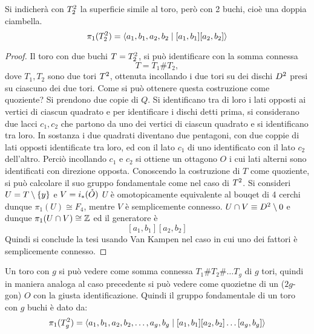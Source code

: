 \documentclass[]{article}
\begin{document}
\begin{proposition}  \nl
    Si indicher\`a con $T^{2}_{2}$ la superficie simile al toro, per\`o con 2 buchi, cio\`e una doppia ciambella.
    \[
        \pi_1(T^{2}_{2}) = \left< a_1, b_1, a_2, b_2 \mid [a_1, b_1][a_2, b_2]\right>
    \]
\end{proposition}

\begin{proof} \nl
    Il toro con due buchi $T = T^{2}_{2}$, si pu\`o identificare con la somma connessa
    \[
        T = T_1 \# T_2,
    \]
    dove $T_1, T_2$ sono due tori $T^{2}$, ottenuta incollando i due tori su dei dischi $D^{2}$ presi su ciascuno dei due tori. \nl
    Come si pu\`o ottenere questa costruzione come quoziente? \nl
    Si prendono due copie di $Q$. Si identificano tra di loro i lati opposti ai vertici di ciascun quadrato e
    per identificare i dischi detti prima, si considerano due lacci $c_1, c_2$ che partono da uno dei vertici di ciascun quadrato e si identificano tra loro. \nl
    In sostanza i due quadrati diventano due pentagoni, con due coppie di lati opposti identificate tra loro, ed con il lato $c_1$ di uno identificato con il lato $c_2$ dell'altro. \nl
    Perci\`o incollando $c_1$ e $c_2$ si ottiene un ottagono $O$ i cui lati alterni sono identificati con direzione opposta. \nl
    Conoscendo la costruzione di $T$ come quoziente, si pu\`o calcolare il suo gruppo fondamentale come nel caso di $T^{2}$. \nl
    Si consideri $U = T \setminus \left\{ y \right\}$ e $V = i_*(\mathring{O})$ \nl
    $U$ \`e omotopicamente equivalente al bouqet di 4 cerchi dunque $\pi_1(U) \cong F_4$, mentre $V$ \`e semplicemente connesso.
    $U \cap V \equiv D^{2} \setminus {0}$ e dunque $\pi_1(U \cap V) \cong \mathbb{Z}$ ed il generatore \`e
    \[
        [a_1, b_1][a_2, b_2]
    \]
    Quindi si conclude la tesi usando Van Kampen nel caso in cui uno dei fattori \`e semplicemente connesso.
\end{proof}

\begin{proposition}  \nl
    Un toro con $g$ si pu\`o vedere come somma connessa $T_1 \# T_2 \# \dots T_g$ di $g$ tori, quindi in maniera analoga al caso precedente
    si pu\`o vedere come quozietne di un ($2g$-gon) $O$ con la giusta identificazione. \nl
    Quindi il gruppo fondamentale di un toro con $g$ buchi \`e dato da:
    \[
        \pi_1(T^{2}_{g}) = \left< a_1, b_1, a_2, b_2, \ldots, a_g, b_g \mid [a_1, b_1][a_2, b_2] \ldots [a_g, b_g]\right>
    \]
\end{proposition}
\end{document}
